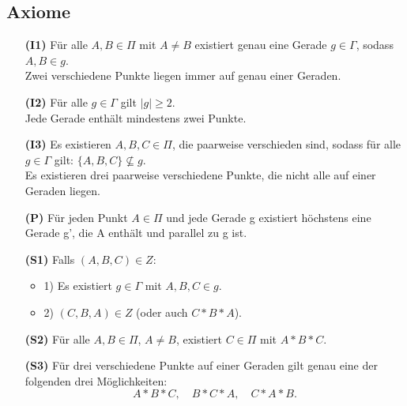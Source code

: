 \documentclass[a4paper,12pt]{article}
\theoremstyle{break}
\begin{document}
\subsection{Axiome}
\begin{itemize}
    \item[\textbf{(I1)}] Für alle $A, B \in \Pi$ mit $A \neq B$ existiert genau eine Gerade $g \in \Gamma$, sodass $A, B \in g$. \\
    Zwei verschiedene Punkte liegen immer auf genau einer Geraden.
    \item[\textbf{(I2)}] Für alle $g \in \Gamma$ gilt $|g| \geq 2$. \\
    Jede Gerade enthält mindestens zwei Punkte.
    \item[\textbf{(I3)}] Es existieren $A, B, C \in \Pi$, die paarweise verschieden sind, sodass für alle $g \in \Gamma$ gilt: $\{A, B, C\} \nsubseteq g$. \\
    Es existieren drei paarweise verschiedene Punkte, die nicht alle auf einer Geraden liegen.
    \item[\textbf{(P)}] Für jeden Punkt $A\in\Pi$ und jede Gerade g existiert höchstens eine Gerade g', die A enthält und parallel zu g ist. 
    \item[\textbf{(S1)}] Falls \((A, B, C) \in Z\):
    \begin{itemize}
        \item 1) Es existiert \(g \in \Gamma\) mit \(A, B, C \in g\).
        \item 2) \((C, B, A) \in Z\) (oder auch \(C * B * A\)).
    \end{itemize}
    
    \item[\textbf{(S2)}] Für alle \(A, B \in \Pi\), \(A \neq B\), existiert \(C \in \Pi\) mit \(A * B * C\).
    
    \item[\textbf{(S3)}] Für drei verschiedene Punkte auf einer Geraden gilt genau eine der folgenden drei Möglichkeiten:
    \[
    A * B * C, \quad B * C * A, \quad C * A * B.
    \]
    

\end{itemize}
\end{document}
